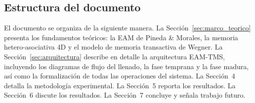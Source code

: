 \subsection*{Estructura del documento}

El documento se organiza de la siguiente manera.
La Sección~\ref{sec:marco_teorico} presenta los fundamentos teóricos: la EAM de Pineda
\& Morales, la memoria hetero-asociativa 4D y el modelo de memoria transactiva de Wegner.
La Sección~\ref{sec:arquitectura} describe en detalle la arquitectura EAM-TMS, incluyendo
los diagramas de flujo del llenado, la fase temprana y la fase madura, así como la
formalización de todas las operaciones del sistema.
La Sección~4 detalla la metodología experimental.
La Sección~5 reporta los resultados.
La Sección~6 discute los resultados.
La Sección~7 concluye y señala trabajo futuro.
